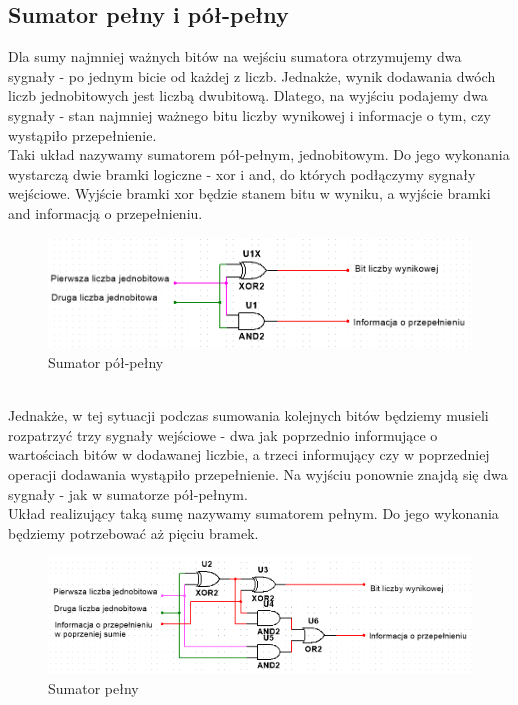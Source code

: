 \documentclass{article}
\begin{document}
        \subsection{Sumator pełny i pół-pełny}
            Dla sumy najmniej ważnych bitów na wejściu sumatora otrzymujemy dwa sygnały - po jednym bicie od każdej z liczb. Jednakże, wynik dodawania dwóch liczb jednobitowych jest liczbą dwubitową. Dlatego, na wyjściu podajemy dwa sygnały - stan najmniej ważnego bitu liczby wynikowej i informacje o tym, czy wystąpiło przepełnienie.\\
            Taki układ nazywamy sumatorem pół-pełnym, jednobitowym. Do jego wykonania wystarczą dwie bramki logiczne - xor i and, do których podłączymy sygnały wejściowe. Wyjście bramki xor będzie stanem bitu w wyniku, a wyjście bramki and informacją o przepełnieniu. \\
            \begin{figure}[h!]
                \centering
                \includegraphics[width=13cm]{reports/img/Z1A_polpelny.png}
                \caption{Sumator pół-pełny}
            \end{figure}\\
            \FloatBarrier
            Jednakże, w tej sytuacji podczas sumowania kolejnych bitów będziemy musieli rozpatrzyć trzy sygnały wejściowe - dwa jak poprzednio informujące o wartościach bitów w dodawanej liczbie, a trzeci informujący czy w poprzedniej operacji dodawania wystąpiło przepełnienie. Na wyjściu ponownie znajdą się dwa sygnały - jak w sumatorze pół-pełnym.\\
            Układ realizujący taką sumę nazywamy sumatorem pełnym. Do jego wykonania będziemy potrzebować aż pięciu bramek. 
            \begin{figure}[h!]
                \centering
                \includegraphics[width=13cm]{reports/img/Z1A_pelny.png}
                \caption{Sumator pełny}
            \end{figure}\\
\end{document}
